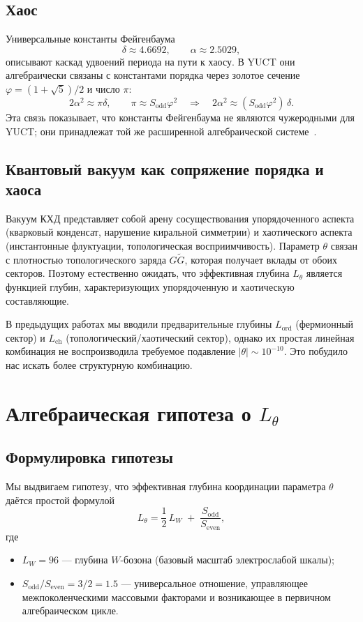 \documentclass[11pt,a4paper]{article}
\begin{document}
	\subsection{Хаос}
	Универсальные константы Фейгенбаума
	\[
	\delta \approx 4.6692,\qquad \alpha \approx 2.5029,
	\]
	описывают каскад удвоений периода на пути к хаосу. В YUCT они алгебраически связаны с константами порядка через золотое сечение \(\varphi = (1+\sqrt{5})/2\) и число \(\pi\):
	\[
	2\alpha^2 \approx \pi\delta,\qquad
	\pi \approx S_{\mathrm{odd}}\varphi^2 \quad \Longrightarrow \quad 
	2\alpha^2 \approx (S_{\mathrm{odd}}\varphi^2)\,\delta .
	\]
	Эта связь показывает, что константы Фейгенбаума не являются чужеродными для YUCT; они принадлежат той же расширенной алгебраической системе~\cite{Y2}.
	
	\subsection{Квантовый вакуум как сопряжение порядка и хаоса}
	Вакуум КХД представляет собой арену сосуществования упорядоченного аспекта (кварковый конденсат, нарушение киральной симметрии) и хаотического аспекта (инстантонные флуктуации, топологическая восприимчивость). Параметр \(\theta\) связан с плотностью топологического заряда \(G\widetilde{G}\), которая получает вклады от обоих секторов. Поэтому естественно ожидать, что эффективная глубина \(L_\theta\) является функцией глубин, характеризующих упорядоченную и хаотическую составляющие.
	
	В предыдущих работах мы вводили предварительные глубины \(L_{\mathrm{ord}}\) (фермионный сектор) и \(L_{\mathrm{ch}}\) (топологический/хаотический сектор), однако их простая линейная комбинация не воспроизводила требуемое подавление \(|\theta| \sim 10^{-10}\). Это побудило нас искать более структурную комбинацию.
	
	\section{Алгебраическая гипотеза о \(L_\theta\)}
	\label{sec:hypothesis}
	
	\subsection{Формулировка гипотезы}
	
	Мы выдвигаем гипотезу, что эффективная глубина координации параметра \(\theta\) даётся простой формулой
	\begin{equation}
		\boxed{L_\theta = \frac{1}{2}\,L_W \;+\; \frac{S_{\mathrm{odd}}}{S_{\mathrm{even}}}},
		\label{eq:Ltheta}
	\end{equation}
	где
	\begin{itemize}
		\item \(L_W = 96\) — глубина \(W\)-бозона (базовый масштаб электрослабой шкалы);
		\item \(S_{\mathrm{odd}}/S_{\mathrm{even}} = 3/2 = 1.5\) — универсальное отношение, управляющее межпоколенческими массовыми факторами и возникающее в первичном алгебраическом цикле.
	\end{itemize}
	
\end{document}
